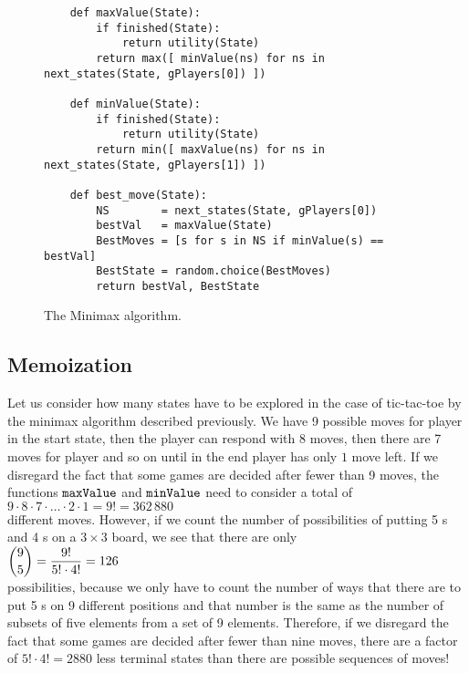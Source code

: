 \begin{figure}[!ht]
\centering
\begin{verbatim}
    def maxValue(State):
        if finished(State):
            return utility(State)
        return max([ minValue(ns) for ns in next_states(State, gPlayers[0]) ])
    
    def minValue(State):  
        if finished(State):
            return utility(State)
        return min([ maxValue(ns) for ns in next_states(State, gPlayers[1]) ])
    
    def best_move(State):
        NS        = next_states(State, gPlayers[0])
        bestVal   = maxValue(State)
        BestMoves = [s for s in NS if minValue(s) == bestVal]
        BestState = random.choice(BestMoves)
        return bestVal, BestState
\end{verbatim}
\caption{The Minimax algorithm.}
\label{fig:Minimax.ipynb}
\end{figure}
\FloatBarrier

\subsection{Memoization}
Let us consider how many states have to be explored in the case of tic-tac-toe by the minimax algorithm
described previously.  We have 9 possible moves for player  in the start state, then the player
 can respond with 8 moves, then there are 7 moves for player  and so on until in the end
player  has only $1$ move left.  If we disregard 
the fact that some games are decided after fewer than 9 moves, the functions $\texttt{maxValue}$ and
$\texttt{minValue}$ need to consider  a total of
\\[0.2cm]
\hspace*{1.3cm}
$9 \cdot 8 \cdot 7 \cdot {\dots} \cdot 2 \cdot 1 = 9! = 362\,880$
\\[0.2cm]
different moves.  However, if we count the number of possibilities of putting 5 s and 4
s on a $3 \times 3$ board, we see that there are only
\\[0.2cm]
\hspace*{1.3cm}
$\displaystyle {9 \choose 5} = \frac{9!}{5! \cdot 4!} = 126$
\\[0.2cm]
possibilities, because we only have to count the number of ways that there are to put 5 s on
9 different positions and that number is the same as the number of subsets of five
elements from a set of 9 elements. 
Therefore, if we disregard the fact that some games are decided after fewer than nine moves,  there are a
factor of $5! \cdot 4! = 2880$ less terminal states than there are possible sequences of moves!

